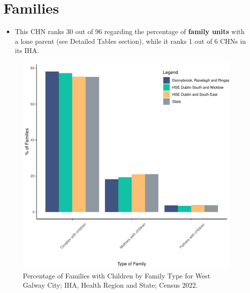 \documentclass{article}
\begin{document}
\section{Families}\label{sect:Fam}
\begin{itemize}
\item This CHN ranks  30 out of 96 regarding the percentage of \textbf{family units} with a lone parent (see Detailed Tables section), while it ranks   1 out of 6 CHNs in its IHA.
\end{itemize}
\begin{figure}[H]
	\centering
	\includegraphics[width = 150mm]{../figures/FamED.pdf}
	\caption{Percentage of Families with Children by Family Type for West Galway City; IHA, Health Region and State; Census 2022.}
	\label{fig:vbnv}
	\end{figure}
	
\end{document}

